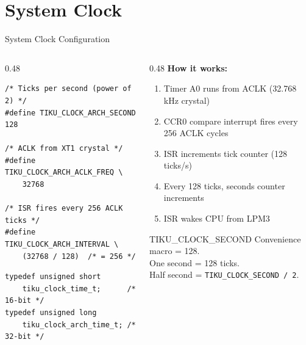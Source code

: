 \documentclass[aspectratio=169, 10pt]{beamer}
\begin{document}
\section{System Clock}

\begin{frame}[fragile]{System Clock Configuration}
\begin{columns}[T]
\begin{column}{0.48\textwidth}
\begin{lstlisting}[style=cstyle,
  title={arch/msp430/tiku\_timer\_arch.h}]
/* Ticks per second (power of 2) */
#define TIKU_CLOCK_ARCH_SECOND  128

/* ACLK from XT1 crystal */
#define TIKU_CLOCK_ARCH_ACLK_FREQ \
    32768

/* ISR fires every 256 ACLK ticks */
#define TIKU_CLOCK_ARCH_INTERVAL \
    (32768 / 128)  /* = 256 */
\end{lstlisting}

\begin{lstlisting}[style=cstyle, title={Clock types}]
typedef unsigned short
    tiku_clock_time_t;      /* 16-bit */
typedef unsigned long
    tiku_clock_arch_time_t; /* 32-bit */
\end{lstlisting}
\end{column}

\begin{column}{0.48\textwidth}
\textbf{How it works:}
\begin{enumerate}
  \item Timer A0 runs from ACLK (32.768\,kHz crystal)
  \item CCR0 compare interrupt fires every 256 ACLK cycles
  \item ISR increments tick counter (128 ticks/s)
  \item Every 128 ticks, seconds counter increments
  \item ISR wakes CPU from LPM3
\end{enumerate}

\vspace{0.3em}
\begin{block}{TIKU\_CLOCK\_SECOND}
Convenience macro = 128.\\
One second = 128 ticks.\\
Half second = \texttt{TIKU\_CLOCK\_SECOND / 2}.
\end{block}
\end{column}
\end{columns}
\end{frame}
\end{document}
